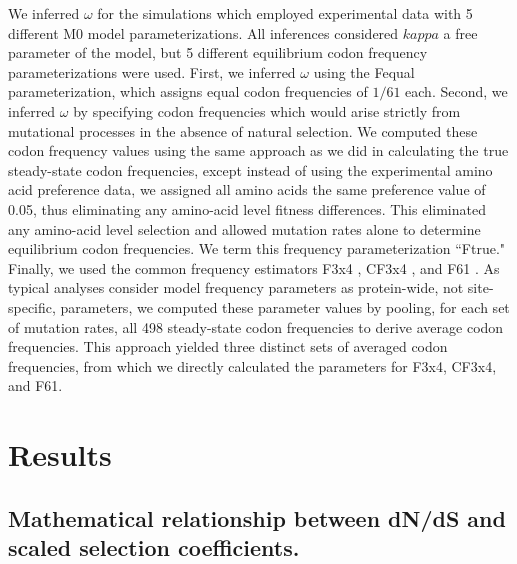 \documentclass{pnastwo}
\begin{document}
\begin{article}
We inferred $\omega$ for the simulations which employed experimental data with 5 different M0 model parameterizations. All inferences considered $kappa$ a free parameter of the model, but 5 different equilibrium codon frequency parameterizations were used. First, we inferred $\omega$ using the Fequal \cite{Yang2006} parameterization, which assigns equal codon frequencies of $1/61$ each. Second, we inferred $\omega$ by specifying codon frequencies which would arise strictly from mutational processes in the absence of natural selection. We computed these codon frequency values using the same approach as we did in calculating the true steady-state codon frequencies, except instead of using the experimental amino acid preference data, we assigned all amino acids the same preference value of 0.05, thus eliminating any amino-acid level fitness differences. This eliminated any amino-acid level selection and allowed mutation rates alone to determine equilibrium codon frequencies. We term this frequency parameterization ``Ftrue." Finally, we used the common frequency estimators F3x4 \cite{MuseGaut1994}, CF3x4 \cite{Pond2010}, and F61 \cite{GoldmanYang1994}. As typical analyses consider model frequency parameters as protein-wide, not site-specific, parameters, we computed these parameter values by pooling, for each set of mutation rates, all 498 steady-state codon frequencies to derive average codon frequencies. This approach yielded three distinct sets of averaged codon frequencies, from which we directly calculated the parameters for F3x4, CF3x4, and F61.








\section*{Results}


\subsection*{Mathematical relationship between dN/dS and scaled selection coefficients.}



\end{article}
\end{document}
